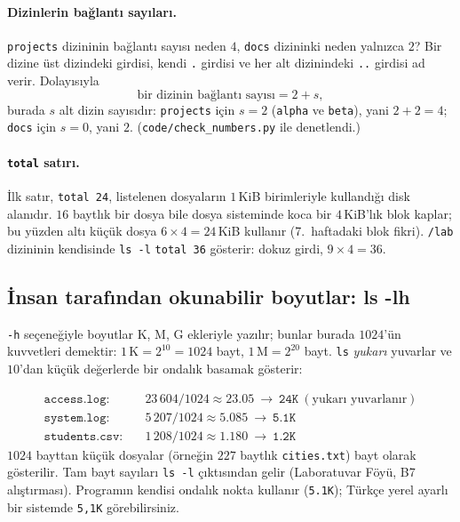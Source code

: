 \documentclass[11pt,a4paper]{article}
\newcommand{\cmd}[1]{\texttt{#1}}
\begin{document}
\paragraph{Dizinlerin bağlantı sayıları.} \texttt{projects} dizininin bağlantı sayısı neden $4$, \texttt{docs} dizininki neden yalnızca $2$? Bir dizine üst dizindeki girdisi, kendi \texttt{.} girdisi ve her alt dizinindeki \texttt{..} girdisi ad verir. Dolayısıyla
\[
\text{bir dizinin bağlantı sayısı} = 2 + s,
\]
burada $s$ alt dizin sayısıdır: \texttt{projects} için $s = 2$ (\texttt{alpha} ve \texttt{beta}), yani $2 + 2 = 4$; \texttt{docs} için $s=0$, yani $2$. (\texttt{code/check\_numbers.py} ile denetlendi.)

\paragraph{\texttt{total} satırı.} İlk satır, \texttt{total 24}, listelenen dosyaların $1$\,KiB birimleriyle kullandığı disk alanıdır. $16$ baytlık bir dosya bile dosya sisteminde koca bir $4$\,KiB'lık blok kaplar; bu yüzden altı küçük dosya $6 \times 4 = 24$\,KiB kullanır (7.\ haftadaki blok fikri). \texttt{\tl/lab} dizininin kendisinde \cmd{ls -l} \texttt{total 36} gösterir: dokuz girdi, $9 \times 4 = 36$.

\subsection{İnsan tarafından okunabilir boyutlar: ls -lh}


\cmd{-h} seçeneğiyle boyutlar K, M, G ekleriyle yazılır; bunlar burada $1024$'ün kuvvetleri demektir: $1\,\text{K} = 2^{10} = 1024$ bayt, $1\,\text{M} = 2^{20}$ bayt. \cmd{ls} \emph{yukarı} yuvarlar ve $10$'dan küçük değerlerde bir ondalık basamak gösterir:

\begin{example}
\begin{align*}
\texttt{access.log}:&\quad 23\,604 / 1024 \approx 23.05 \ \longrightarrow\ \texttt{24K}\ (\text{yukarı yuvarlanır})\\
\texttt{system.log}:&\quad 5\,207 / 1024 \approx 5.085 \ \longrightarrow\ \texttt{5.1K}\\
\texttt{students.csv}:&\quad 1\,208 / 1024 \approx 1.180 \ \longrightarrow\ \texttt{1.2K}
\end{align*}
$1024$ bayttan küçük dosyalar (örneğin $227$ baytlık \texttt{cities.txt}) bayt olarak gösterilir. Tam bayt sayıları \cmd{ls -l} çıktısından gelir (Laboratuvar Föyü, B7 alıştırması). Programın kendisi ondalık nokta kullanır (\texttt{5.1K}); Türkçe yerel ayarlı bir sistemde \texttt{5,1K} görebilirsiniz.
\end{example}
\end{document}
